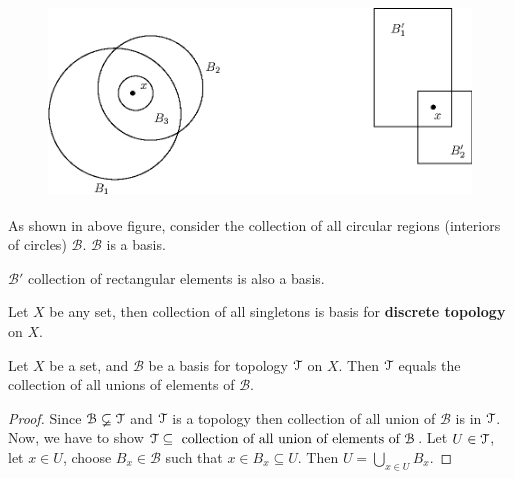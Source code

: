 \documentclass[a4paper,english,12pt]{article}   	%
\begin{document}
\begin{figure}[!h]
 \centering
 \includegraphics[height=2in]{fig134.eps}
\end{figure}

\begin{exmp}
 As shown in above figure, consider the collection of all circular regions (interiors of circles) $\mathcal{B}$. $\mathcal{B}$ is a basis. 
\end{exmp}
\begin{exmp}
 $\mathcal{B}'$ collection of rectangular elements is also a basis. 
\end{exmp}
\begin{exmp}
 Let $X$ be any set, then collection of all singletons is basis for \textbf{discrete topology} on $X$.
\end{exmp}
 \begin{lem}
Let $X$ be a set, and $\mathcal{B}$ be a basis for topology $\mathcal{T}$ on $X$. Then $\mathcal{T}$ equals the collection of all unions of elements of $\mathcal{B}$.
\end{lem}
\begin{proof} Since $\mathcal{B}\varsubsetneq\mathcal{T}$ and $\mathcal{T}$ is a topology then collection of all union of $\mathcal{B}$ is in $\mathcal{T}$. Now, we have to show $\mathcal{T}\subseteq \text{ collection of all union of elements of } \mathcal{B}$. Let $U\in \mathcal{T}$, let $x\in U$, choose $B_x\in \mathcal{B}$ such that $x\in B_x\subseteq U$. Then $U=\bigcup_{x\in U}B_x$.
\end{proof}
\end{document}
